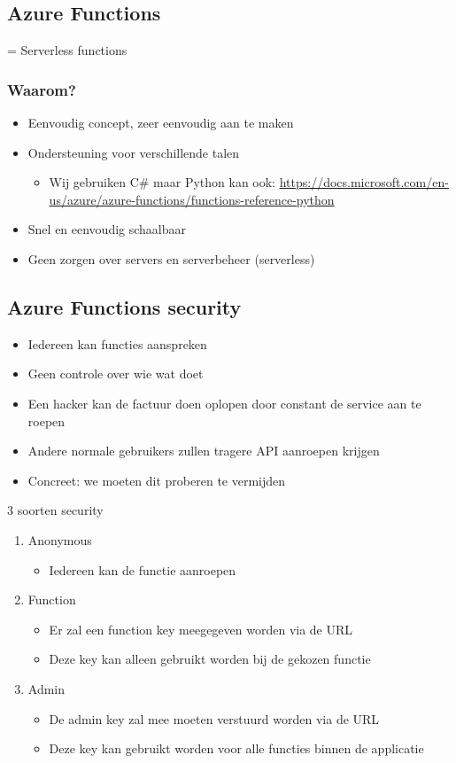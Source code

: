 \documentclass{article}
\begin{document}
\subsection{Azure Functions}
= Serverless functions 

\subsubsection{Waarom?}
\begin{itemize}
    \item Eenvoudig concept, zeer eenvoudig aan te maken
    \item Ondersteuning voor verschillende talen
    \begin{itemize}
        \item Wij gebruiken C\# maar Python kan ook: \url{https://docs.microsoft.com/en-us/azure/azure-functions/functions-reference-python}
    \end{itemize}
    \item Snel en eenvoudig schaalbaar
    \item Geen zorgen over servers en serverbeheer (serverless)
\end{itemize}

\subsection{Azure Functions security}
\begin{itemize}
    \item Iedereen kan functies aanspreken
    \item Geen controle over wie wat doet
    \item Een hacker kan de factuur doen oplopen door constant de service aan te roepen
    \item Andere normale gebruikers zullen tragere API aanroepen krijgen
    \item Concreet: we moeten dit proberen te vermijden
\end{itemize}

3 soorten security

\begin{enumerate}
    \item Anonymous
    \begin{itemize}
        \item Iedereen kan de functie aanroepen
    \end{itemize}
    \item Function
    \begin{itemize}
        \item Er zal een function key meegegeven worden via de URL
        \item Deze key kan alleen gebruikt worden bij de gekozen functie
    \end{itemize}
    \item Admin 
    \begin{itemize}
        \item De admin key zal mee moeten verstuurd worden via de URL
        \item Deze key kan gebruikt worden voor alle functies binnen de applicatie
    \end{itemize}
\end{enumerate}
\end{document}
